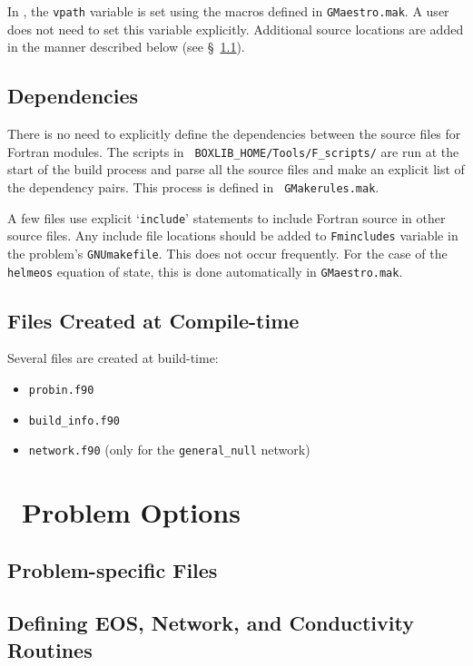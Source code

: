 In \maestro, the {\tt vpath} variable is set using the macros defined
in {\tt GMaestro.mak}.  A user does not need to set this variable
explicitly.  Additional source locations are added in the manner
described below (see \S~\ref{sec:make:otherfiles}).

\subsection{Dependencies}

There is no need to explicitly define the dependencies between the
source files for Fortran modules.  The scripts in {\tt
BOXLIB\_HOME/Tools/F\_scripts/} are run at the start of the build
process and parse all the source files and make an explicit list of
the dependency pairs.  This process is defined in {\tt
GMakerules.mak}.

A few files use explicit `{\tt include}' statements to include Fortran
source in other source files.  Any include file locations should be
added to {\tt Fmincludes} variable in the problem's {\tt GNUmakefile}.
This does not occur frequently.  For the case of the {\tt helmeos}
equation of state, this is done automatically in {\tt GMaestro.mak}.


\subsection{Files Created at Compile-time}

Several files are created at build-time:
\begin{itemize}
\item {\tt probin.f90}

\item {\tt build\_info.f90}

\item {\tt network.f90} (only for the {\tt general\_null} network)
\end{itemize}



\section{\maestro\ Problem Options}

\subsection{Problem-specific Files}
\label{sec:make:otherfiles}


\subsection{Defining EOS, Network, and Conductivity Routines}


